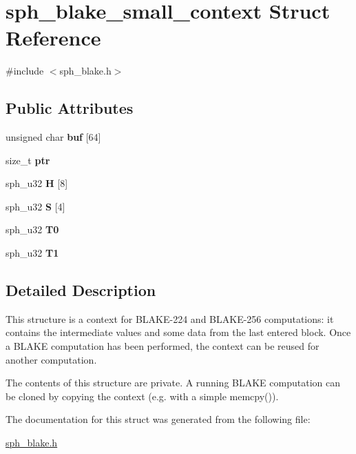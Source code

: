 \hypertarget{structsph__blake__small__context}{}\section{sph\+\_\+blake\+\_\+small\+\_\+context Struct Reference}
\label{structsph__blake__small__context}


{\ttfamily \#include $<$sph\+\_\+blake.\+h$>$}

\subsection*{Public Attributes}
\begin{DoxyCompactItemize}
\item 
\mbox{\label{structsph__blake__small__context_af9d5fc7974274fb2947c3b3f4b37963d}} 
unsigned char {\bfseries buf} \mbox{[}64\mbox{]}
\item 
\mbox{\label{structsph__blake__small__context_aa1c49e1bd07dd9e346d4dafe22552d72}} 
size\+\_\+t {\bfseries ptr}
\item 
\mbox{\label{structsph__blake__small__context_a0a860270f4fdff75da67e257f358b4f8}} 
sph\+\_\+u32 {\bfseries H} \mbox{[}8\mbox{]}
\item 
\mbox{\label{structsph__blake__small__context_ab61df4e8f58da409a243f225237aa6c2}} 
sph\+\_\+u32 {\bfseries S} \mbox{[}4\mbox{]}
\item 
\mbox{\label{structsph__blake__small__context_a17be56c2d6b9110e390720851b33429e}} 
sph\+\_\+u32 {\bfseries T0}
\item 
\mbox{\label{structsph__blake__small__context_a494dd406d70bcd90e976cf915cf87f02}} 
sph\+\_\+u32 {\bfseries T1}
\end{DoxyCompactItemize}


\subsection{Detailed Description}
This structure is a context for B\+L\+A\+K\+E-\/224 and B\+L\+A\+K\+E-\/256 computations\+: it contains the intermediate values and some data from the last entered block. Once a B\+L\+A\+KE computation has been performed, the context can be reused for another computation.

The contents of this structure are private. A running B\+L\+A\+KE computation can be cloned by copying the context (e.\+g. with a simple {\ttfamily memcpy()}). 

The documentation for this struct was generated from the following file\+:\begin{DoxyCompactItemize}
\item 
\mbox{\hyperlink{sph__blake_8h}{sph\+\_\+blake.\+h}}\end{DoxyCompactItemize}
